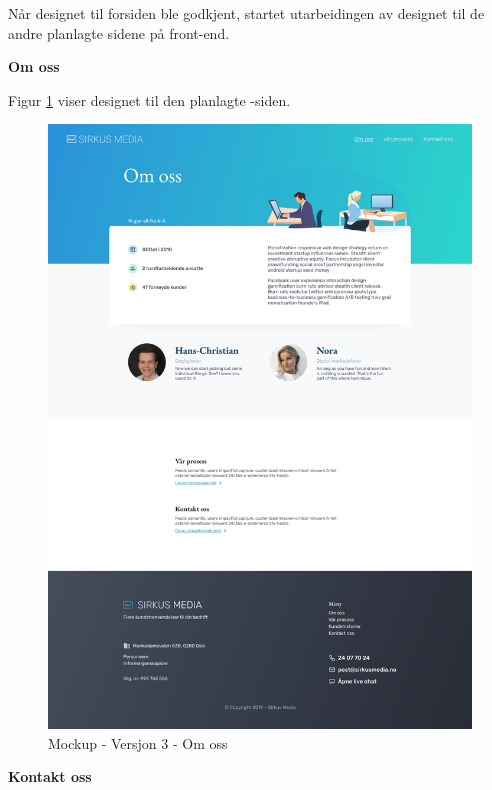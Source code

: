 Når designet til forsiden ble godkjent, startet utarbeidingen av designet til de andre planlagte sidene på front-end.

\textbf{Om oss}

Figur \ref{fig:mockup-v3-about} viser designet til den planlagte -siden.
\begin{figure}[H]
    \centering
    \includegraphics[height=.9\textheight]{design/mockup3-about.png}
    \caption{Mockup - Versjon 3 - Om oss}
    \label{fig:mockup-v3-about}
\end{figure}

\textbf{Kontakt oss}


